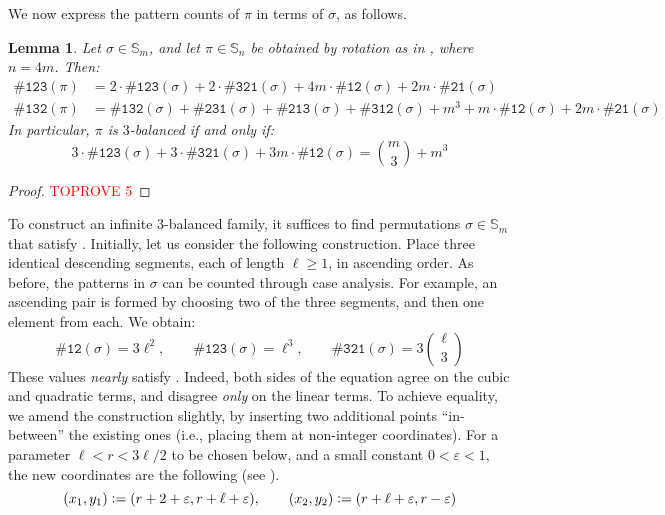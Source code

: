 \documentclass{article}
\newtheorem{lemma}[theorem]{Lemma}
\newcommand{\threeb}{$3$-balanced\xspace}
\newcommand{\pc}[2]{{\# \mathtt{ #1 } \left( #2 \right)}}
\newcommand{\eqdef}{\vcentcolon=}
\theoremstyle{remark}
\theoremstyle{plain}
\begin{document}
We now express the pattern counts of $\pi$ in terms of $\sigma$, as follows.

\begin{lemma}
    \label{lemma:pi_rot_inv_sigma_profile}
    Let $\sigma\in\mathbb{S}_m$, and let $\pi\in\mathbb{S}_n$ be obtained by rotation as in , where $n=4m$. Then:
    \begin{align*}
        \pc{123}{\pi} & = 2\cdot\pc{123}{\sigma} + 2\cdot\pc{321}{\sigma} + 4m\cdot\pc{12}{\sigma}+2m\cdot\pc{21}{\sigma} \\
        \pc{132}{\pi} & = \pc{132}{\sigma} + \pc{231}{\sigma} + \pc{213}{\sigma} + \pc{312}{\sigma} + m^3 + m\cdot\pc{12}{\sigma} + 2m\cdot\pc{21}{\sigma}
    \end{align*}
    In particular, $\pi$ is \threeb if and only if:
    \begin{equation}
        \label{eq:sigma3bal}
        3\cdot \pc{123}{\sigma}+3\cdot\pc{321}{\sigma}+3m\cdot\pc{12}{\sigma}=\binom{m}{3}+m^3
    \end{equation}
\end{lemma}
\begin{proof}\textcolor{red}{TOPROVE 5}\end{proof}
To construct an infinite \threeb family, it suffices to find permutations $\sigma\in\mathbb{S}_m$ that satisfy . Initially, let us consider the following construction. Place three identical descending segments, each of length $\ell\geq 1$, in ascending order. As before, the patterns in $\sigma$ can be counted through case analysis. For example, an ascending pair is formed by choosing two of the three segments, and then one element from each. We obtain:
\[
    \pc{12}{\sigma} = 3 \ell^2, \qquad
    \pc{123}{\sigma} = \ell^3, \qquad
    \pc{321}{\sigma} = 3 \binom{\ell}{3}
\]
These values \emph{nearly} satisfy . Indeed, both sides of the equation agree on the cubic and quadratic terms, and disagree \emph{only} on the linear terms. To achieve equality, we amend the construction slightly, by inserting two additional points ``in-between'' the existing ones (i.e., placing them at non-integer coordinates). For a parameter $\ell < r < 3\ell/2$ to be chosen below, and a small constant $0 < \varepsilon < 1$, the new coordinates are the following (see ).
\[
    (x_1,y_1) \eqdef (r+2+\varepsilon,r+\ell+\varepsilon), \qquad
    (x_2,y_2) \eqdef (r+\ell+\varepsilon,r-\varepsilon)
\]
\end{document}
